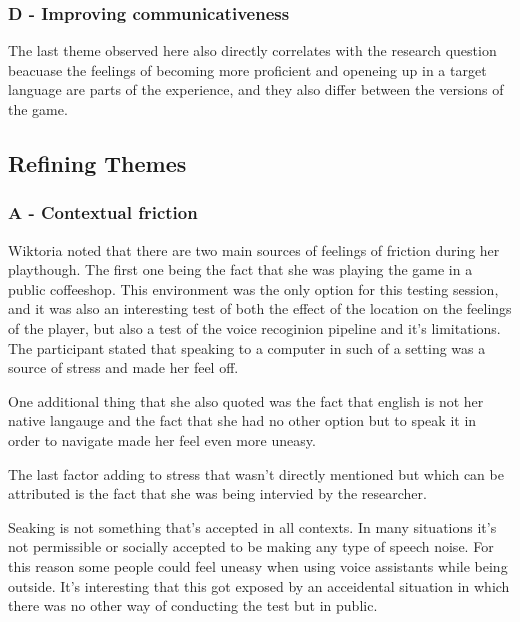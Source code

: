 

\subsubsection{D - Improving communicativeness}

The last theme observed here also directly correlates with the research question beacuase the feelings of becoming more proficient and openeing up in a target language are parts of the experience, and they also differ between the versions of the game.





\subsection{Refining Themes}

\subsubsection{A - Contextual friction}
Wiktoria noted that there are two main sources of feelings of friction during her playthough.
The first one being the fact that she was playing the game in a public coffeeshop. This environment was the only option for this testing session, and it was also an interesting test of both the effect of the location on the feelings of the player, but also a test of the voice recoginion pipeline and it's limitations. 
The participant stated that speaking to a computer in such of a setting was a source of stress and made her feel off. 

One additional thing that she also quoted was the fact that english is not her native langauge and the fact that she had no other option but to speak it in order to navigate made her feel even more uneasy.

The last factor adding to stress that wasn't directly mentioned but which can be attributed is the fact that she was being intervied by the researcher. 

Seaking is not something that's accepted in all contexts. In many situations it's not permissible or socially accepted to be making any type of speech noise. For this reason some people could feel uneasy when using voice assistants while being outside. It's interesting that this got exposed by an acceidental situation in which there was no other way of conducting the test but in public.


